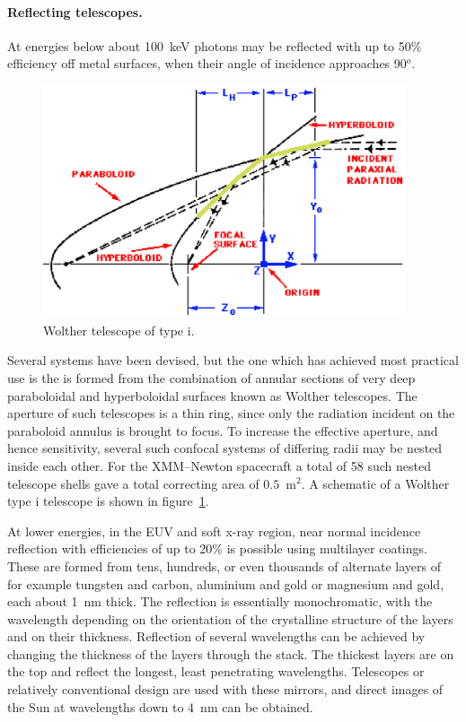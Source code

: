 \paragraph{Reflecting telescopes.} At energies below about 100~keV photons
may be reflected with up to 50\% efficiency off metal surfaces, when
their angle of incidence approaches 90$^o$.

\begin{figure}[h]
  \centering
	\includegraphics[width=0.95\textwidth]{paraboloid_hyperboloid.eps}
  \caption{Wolther telescope of type {\sc i}.}
  \label{fig:wolther_i}
\end{figure}

Several systems have been devised, but the one which has achieved most practical
use is the is formed from the combination of annular sections of very deep paraboloidal
and hyperboloidal surfaces known as Wolther telescopes. The aperture of such
telescopes is a thin ring, since only the radiation incident on the paraboloid annulus is 
brought to focus. To increase the effective aperture, and hence sensitivity, several
such confocal systems of differing radii may be nested inside each other. For the 
XMM--Newton spacecraft a total of 58 such nested telescope shells gave a total
correcting area of $0.5$~m$^2$. A schematic of a Wolther type {\sc i} telescope is shown
in figure~\ref{fig:wolther_i}.

At lower energies, in the EUV and soft x-ray region, near normal incidence
reflection with efficiencies of up to 20\% is possible using multilayer coatings.
These are formed from tens,  hundreds, or even thousands of alternate layers of 
for example tungsten and carbon, aluminium and gold or magnesium and gold,
each about 1~nm thick. The reflection is essentially monochromatic, with the 
wavelength depending on the orientation of the crystalline structure of the layers and
on their thickness. Reflection of several wavelengths can be achieved by changing 
the thickness of the layers through the stack. The thickest layers are on the top and
reflect the longest, least penetrating wavelengths. Telescopes or relatively 
conventional design are used with these mirrors, and direct images of the Sun 
at wavelengths down to 4~nm can be obtained.

